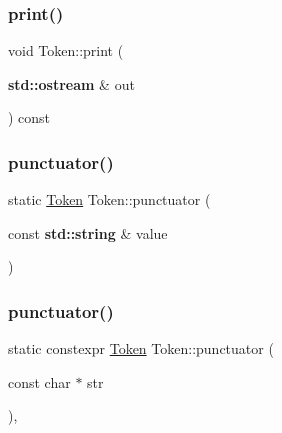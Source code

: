 \subsubsection{\texorpdfstring{print()}{print()}\hspace{0.1cm}{\footnotesize\ttfamily [2/2]}}
{\footnotesize\ttfamily void Token\+::print (\begin{DoxyParamCaption}\item[{\textbf{ std\+::ostream} \&}]{out }\end{DoxyParamCaption}) const\hspace{0.3cm}{\ttfamily [inline]}}

\mbox{\label{class_token_a62120a6cb34feb44f709af396234d1bb}} 
\subsubsection{\texorpdfstring{punctuator()}{punctuator()}\hspace{0.1cm}{\footnotesize\ttfamily [1/3]}}
{\footnotesize\ttfamily static \hyperlink{class_token}{Token} Token\+::punctuator (\begin{DoxyParamCaption}\item[{const \textbf{ std\+::string} \&}]{value }\end{DoxyParamCaption})\hspace{0.3cm}{\ttfamily [static]}}

\mbox{\label{class_token_af63a6600ca9c654e40bea24483b2226e}} 
\subsubsection{\texorpdfstring{punctuator()}{punctuator()}\hspace{0.1cm}{\footnotesize\ttfamily [2/3]}}
{\footnotesize\ttfamily static constexpr \hyperlink{class_token}{Token} Token\+::punctuator (\begin{DoxyParamCaption}\item[{const char $\ast$}]{str }\end{DoxyParamCaption})\hspace{0.3cm}{\ttfamily [inline]}, {\ttfamily [static]}}

\mbox{\label{class_token_a958d66fdb60bf55bc8ac8c4ea197e8b8}} 
